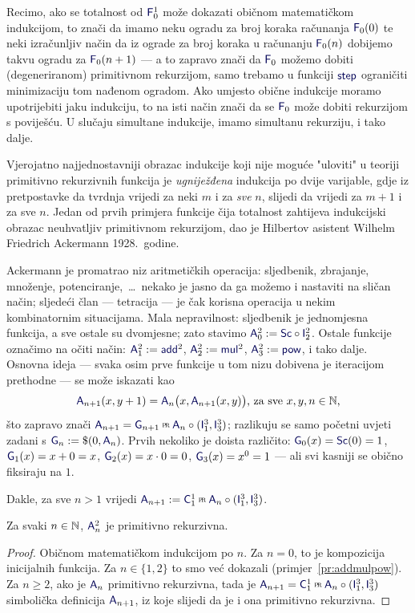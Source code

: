 Recimo, ako se totalnost od $\f F_0^1$ može dokazati običnom matematičkom indukcijom, to znači da imamo neku ogradu za broj koraka računanja $\f F_0(0)$ te neki izračunljiv način da iz ograde za broj koraka u računanju $\f F_0(n)$ dobijemo takvu ogradu za $\f F_0(n+1)$ --- a to zapravo znači da $\f F_0$ možemo dobiti (degeneriranom) primitivnom rekurzijom, samo trebamo u funkciji $\f{step}$ ograničiti minimizaciju tom nađenom ogradom. Ako umjesto obične indukcije moramo upotrijebiti jaku indukciju, to na isti način znači da se $\f F_0$ može dobiti rekurzijom s poviješću. U slučaju simultane indukcije, imamo simultanu rekurziju, i tako dalje.

Vjerojatno najjednostavniji obrazac indukcije koji nije moguće "uloviti" u teoriji primitivno rekurzivnih funkcija je \emph{ugniježđena} indukcija po dvije varijable, gdje iz pretpostavke da tvrdnja vrijedi za neki $m$ i za \emph{sve} $n$, slijedi da vrijedi za $m+1$ i za sve $n$. Jedan od prvih primjera funkcije čija totalnost zahtijeva indukcijski obrazac neuhvatljiv primitivnom rekurzijom, dao je Hilbertov asistent Wilhelm Friedrich Ackermann 1928.\ godine.

Ackermann je promatrao niz aritmetičkih operacija: sljedbenik, zbrajanje, množenje, potenciranje,~\ldots\ nekako je jasno da ga možemo i nastaviti na sličan način; sljedeći član --- tetracija --- je čak korisna operacija u nekim kombinatornim situacijama. Mala nepravilnost: sljedbenik je jednomjesna funkcija, a sve ostale su dvomjesne; zato stavimo $\f A_0^2:=\f{Sc}\circ \f I_2^2$. Ostale funkcije označimo na očiti način: $\f A_1^2:=\f{add}^2$, $\f A_2^2:=\f{mul}^2$, $\f A_3^2:=\f{pow}$, i tako dalje. Osnovna ideja --- svaka osim prve funkcije u tom nizu dobivena je iteracijom prethodne --- se može iskazati kao
\begin{equation}\label{eq:A2SSdef}
    \f A_{n+1}(x,y+1)=\f A_n\bigl(x,\f A_{n+1}(x,y)\bigr)\text{, za sve }x,y,n\in\N\text,
\end{equation}
što zapravo znači $\f A_{n+1}=\f G_{n+1}\pr\f A_n\circ(\f I_1^3,\f I_3^3)$; razlikuju se samo početni uvjeti zadani s $\f G_n:=\$(0,\f A_n)$. Prvih nekoliko je doista različito: $\f G_0(x)=\f{Sc}(0)=1$, $\f G_1(x)=x+0=x$, $\f G_2(x)=x\cdot 0=0$, $\f G_3(x)=x^0=1$ --- ali svi kasniji se obično fiksiraju na $1$.

Dakle, za sve $n>1$ vrijedi $\f A_{n+1}:=\f C_1^1\pr\f A_n\circ(\f I_1^3,\f I_3^3)$.

\begin{propozicija}[{name=[primitivna rekurzivnost generaliziranih aritmetičkih operacija]}]\label{pp:Anprn}
    Za svaki $n\in{\mathbb N}$, $\f A_n^2$ je primitivno rekurzivna.
\end{propozicija}
\begin{proof}
Običnom matematičkom indukcijom po $n$. Za $n=0$, to je kompozicija inicijalnih funkcija. Za $n\in\{1,2\}$ to smo već dokazali (primjer~\ref{pr:addmulpow}). Za $n\ge 2$, ako je $\f A_n$ primitivno rekurzivna, tada je $\f A_{n+1}=\f C_1^1\pr\f A_n\circ(\f I_1^3,\f I_3^3)$ simbolička definicija $\f A_{n+1}$, iz koje slijedi da je i ona primitivno rekurzivna.
\end{proof}

